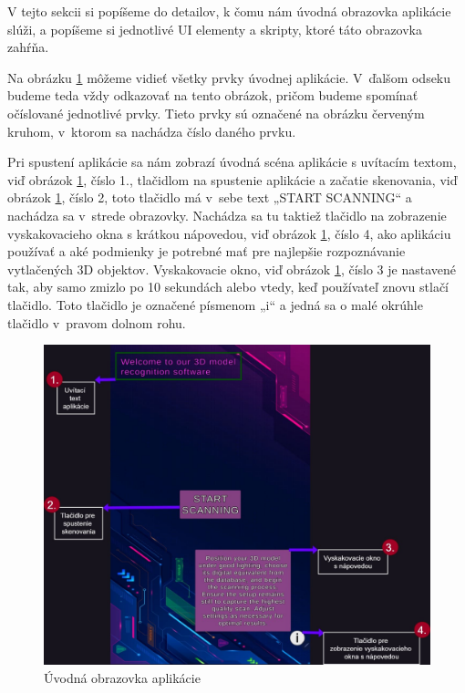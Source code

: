 V tejto sekcii si popíšeme do detailov, k čomu nám úvodná obrazovka aplikácie slúži, a popíšeme si jednotlivé UI elementy a skripty, ktoré táto obrazovka zahŕňa.



Na obrázku \ref{fig:introductionScene} môžeme vidieť všetky prvky úvodnej aplikácie. V~ďalšom odseku budeme teda vždy odkazovať na tento obrázok, pričom budeme spomínať očíslované jednotlivé prvky. Tieto prvky sú označené na obrázku červeným kruhom, v~ktorom sa nachádza číslo daného prvku. 

Pri spustení aplikácie sa nám zobrazí úvodná scéna aplikácie s uvítacím textom, viď obrázok \ref{fig:introductionScene}, číslo 1., tlačidlom na spustenie aplikácie a začatie skenovania, viď obrázok \ref{fig:introductionScene}, číslo 2, toto tlačidlo má v~sebe text „START SCANNING“ a nachádza sa v~strede obrazovky. Nachádza sa tu taktiež tlačidlo na zobrazenie vyskakovacieho okna s krátkou nápovedou, viď obrázok \ref{fig:introductionScene}, číslo 4, ako aplikáciu používať a aké podmienky je potrebné mať pre najlepšie rozpoznávanie vytlačených 3D objektov. Vyskakovacie okno, viď obrázok \ref{fig:introductionScene}, číslo 3 je nastavené tak, aby samo zmizlo po 10 sekundách alebo vtedy, keď používateľ znovu stlačí tlačidlo. Toto tlačidlo je označené písmenom „i“ a jedná sa o malé okrúhle tlačidlo v~pravom dolnom rohu.

\begin{figure}[h]
  \centering
  \includegraphics[width=1\textwidth]{img/Introduction_scene.jpg}
  \caption{Úvodná obrazovka aplikácie}
  \label{fig:introductionScene}
\end{figure}

